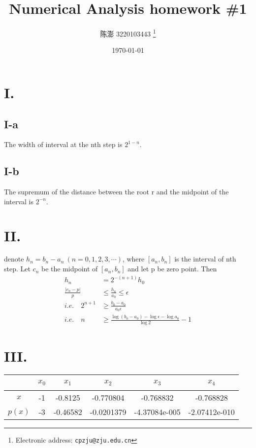 \documentclass[a4paper]{article}
\begin{document}
\title{Numerical Analysis homework \#1}

\author{陈澎 3220103443
  \thanks{Electronic address: \texttt{cpzju@zju.edu.cn}}}


\date{\today}

\maketitle

\section*{I.}

\subsection*{I-a}
The width of interval at the nth step is $2^{1-n}$.

\subsection*{I-b}
The supremum of the distance between the root r and the midpoint of the interval is $2^{-n}$.


\section*{II.}


denote $h_{n}=b_{n}-a_{n}\ (n=0,1,2,3,\cdots)$, where $[a_{n},b_{n}]$ is the interval of nth step. 
Let $c_n$ be the midpoint of $[a_{n},b_{n}]$ and let p be zero point. Then
$$
\begin{aligned}
  h_{n}&=2^{-(n+1)}h_{0} \\
  \frac{\lvert c_{n}-p \rvert}{p} &\leq \frac{h_{n}}{a_{0}} \leq \epsilon \\
  i.e.\quad 2^{n+1} &\geq \frac{b_{0}-a_{0}}{a_{0}\epsilon} \\
  i.e.\quad n &\geq \frac{\log(b_{0}-a_{0})-\log\epsilon-\log a_{0}}{\log2}-1 
\end{aligned}
$$

\section*{III.}
\begin{table}[!ht]
  \centering
  \begin{tabular}{|c|c|c|c|c|c|}
  \hline
      ~ & $x_{0}$ & $x_{1}$ & $x_{2}$ & $x_{3}$ & $x_{4}$ \\ \hline
      $x$ & -1 & -0.8125 & -0.770804 & -0.768832 & -0.768828 \\ \hline
      $p(x)$ & -3 & -0.46582 & -0.0201379 & -4.37084e-005 & -2.07412e-010 \\ \hline
  \end{tabular}
\end{table}
\end{document}
